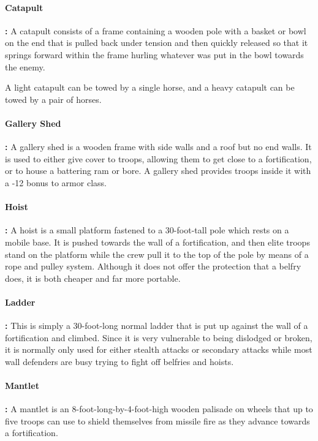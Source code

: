 \begin{multicols*}{2}
\paragraph{Catapult}\textbf{:} A catapult consists of a frame containing a wooden pole with a basket or bowl on the end that is pulled back under tension and then quickly released so that it springs forward within the frame hurling whatever was put in the bowl towards the enemy.

A light catapult can be towed by a single horse, and a heavy catapult can be towed by a pair of horses.

\paragraph{Gallery Shed}\textbf{:} A gallery shed is a wooden frame with side walls and a roof but no end walls. It is used to either give cover to troops, allowing them to get close to a fortification, or to house a battering ram or bore. A gallery shed provides troops inside it with a -12 bonus to armor class.

\paragraph{Hoist}\textbf{:} A hoist is a small platform fastened to a 30-foot-tall pole which rests on a mobile base. It is pushed towards the wall of a fortification, and then elite troops stand on the platform while the crew pull it to the top of the pole by means of a rope and pulley system. Although it does not offer the protection that a belfry does, it is both cheaper and far more portable.

\paragraph{Ladder}\textbf{:} This is simply a 30-foot-long normal ladder that is put up against the wall of a fortification and climbed. Since it is very vulnerable to being dislodged or broken, it is normally only used for either stealth attacks or secondary attacks while most wall defenders are busy trying to fight off belfries and hoists.

\paragraph{Mantlet}\textbf{:} A mantlet is an 8-foot-long-by-4-foot-high wooden palisade on wheels that up to five troops can use to shield themselves from missile fire as they advance towards a fortification.


\end{multicols*}
